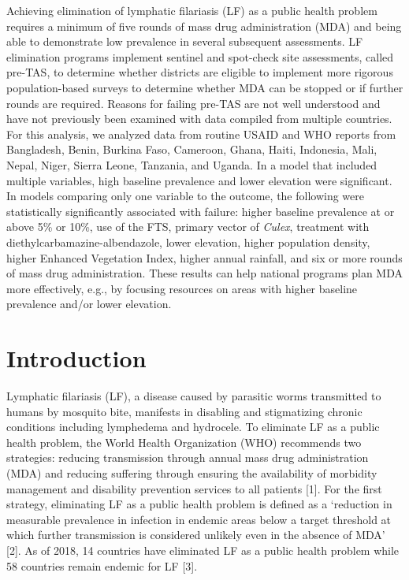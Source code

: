 \documentclass[11pt,a4paper]{article}
\begin{document}
Achieving elimination of lymphatic filariasis (LF) as a public health problem requires a minimum of five rounds of mass drug administration (MDA) and being able to demonstrate low prevalence in several subsequent assessments. LF elimination programs implement sentinel and spot-check site assessments, called pre-TAS, to determine whether districts are eligible to implement more rigorous population-based surveys to determine whether MDA can be stopped or if further rounds are required. Reasons for failing pre-TAS are not well understood and have not previously been examined with data compiled from multiple countries. For this analysis, we analyzed data from routine USAID and WHO reports from Bangladesh, Benin, Burkina Faso, Cameroon, Ghana, Haiti, Indonesia, Mali, Nepal, Niger, Sierra Leone, Tanzania, and Uganda. In a model that included multiple variables, high baseline prevalence and lower elevation were significant. In models comparing only one variable to the outcome, the following were statistically significantly associated with failure: higher baseline prevalence at or above 5\% or 10\%, use of the FTS, primary vector of \textit{Culex}, treatment with diethylcarbamazine-albendazole, lower elevation, higher population density, higher Enhanced Vegetation Index, higher annual rainfall, and six or more rounds of mass drug administration. These results can help national programs plan MDA more effectively, e.g., by focusing resources on areas with higher baseline prevalence and/or lower elevation.

\section{Introduction}

Lymphatic filariasis (LF), a disease caused by parasitic worms transmitted to humans by mosquito bite, manifests in disabling and stigmatizing chronic conditions including lymphedema and hydrocele. To eliminate LF as a public health problem, the World Health Organization (WHO) recommends two strategies: reducing transmission through annual mass drug administration (MDA) and reducing suffering through ensuring the availability of morbidity management and disability prevention services to all patients [1]. For the first strategy, eliminating LF as a public health problem is defined as a ‘reduction in measurable prevalence in infection in endemic areas below a target threshold at which further transmission is considered unlikely even in the absence of MDA’ [2]. As of 2018, 14 countries have eliminated LF as a public health problem while 58 countries remain endemic for LF [3].
\end{document}
